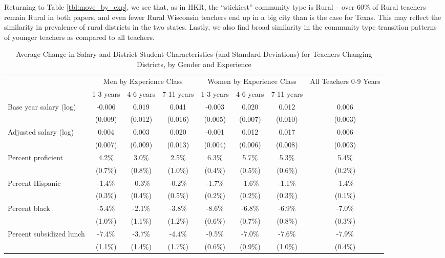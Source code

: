 \documentclass[12pt,]{article}
\begin{document}
Returning to Table \ref{tbl:move_by_exp}, we see that, as in HKR, the
``stickiest'' community type is Rural -- over 60\% of Rural teachers
remain Rural in both papers, and even fewer Rural Wisconsin teachers end
up in a big city than is the case for Texas. This may reflect the
similarity in prevalence of rural districts in the two states. Lastly,
we also find broad similarity in the community type transition patterns
of younger teachers as compared to all teachers.

\begin{sidewaystable}[htbp]
\centering
\begin{tabular}{lccccccc}
  \hline
 & \multicolumn{3}{c}{Men by Experience Class} & \multicolumn{3}{c}{Women by Experience Class} & \multirow{2}{*}{\parbox{0.09\linewidth}{All Teachers 0-9 Years}}\\ \cline{2-4} \cline{5-7}
 & 1-3 years & 4-6 years & 7-11 years & 1-3 years & 4-6 years & 7-11 years &  \\ 
  \hline
Base year salary (log) & -0.006 & 0.019 & 0.041 & -0.003 & 0.020 & 0.012 & 0.006 \\ 
   & (0.009) & (0.012) & (0.016) & (0.005) & (0.007) & (0.010) & (0.003) \\ 
  Adjusted salary (log) & 0.004 & 0.003 & 0.020 & -0.001 & 0.012 & 0.017 & 0.006 \\ 
   & (0.007) & (0.009) & (0.013) & (0.004) & (0.006) & (0.008) & (0.003) \\ 
  Percent proficient & 4.2\% & 3.0\% & 2.5\% & 6.3\% & 5.7\% & 5.3\% & 5.4\% \\ 
   & (0.7\%) & (0.8\%) & (1.0\%) & (0.4\%) & (0.5\%) & (0.6\%) & (0.2\%) \\ 
  Percent Hispanic & -1.4\% & -0.3\% & -0.2\% & -1.7\% & -1.6\% & -1.1\% & -1.4\% \\ 
   & (0.3\%) & (0.4\%) & (0.5\%) & (0.2\%) & (0.2\%) & (0.3\%) & (0.1\%) \\ 
  Percent black & -5.4\% & -2.1\% & -3.8\% & -8.6\% & -6.8\% & -6.9\% & -7.0\% \\ 
   & (1.0\%) & (1.1\%) & (1.2\%) & (0.6\%) & (0.7\%) & (0.8\%) & (0.3\%) \\ 
  Percent subsidized lunch & -7.4\% & -3.7\% & -4.4\% & -9.5\% & -7.0\% & -7.6\% & -7.9\% \\ 
   & (1.1\%) & (1.4\%) & (1.7\%) & (0.6\%) & (0.9\%) & (1.0\%) & (0.4\%) \\ 
   \hline
\end{tabular}
\caption{Average Change in Salary and District Student Characteristics (and Standard Deviations) for Teachers Changing Districts, by Gender and Experience} 
\label{tbl:change_by_ge}
\end{sidewaystable}
\end{document}
